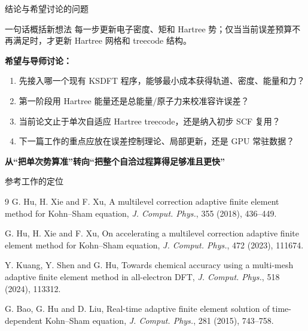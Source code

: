 \documentclass[aspectratio=169,11pt]{beamer}
\begin{document}
\begin{frame}{结论与希望讨论的问题}
  \begin{block}{一句话概括新想法}
    \centering
    每一步更新电子密度、矩和 Hartree 势；仅当当前误差预算不再满足时，才更新 Hartree 网格和 treecode 结构。
  \end{block}

  \vspace{0.35cm}
  \small
  \textbf{希望与导师讨论：}
  \begin{enumerate}\setlength\itemsep{0.48em}
    \item 先接入哪一个现有 KSDFT 程序，能够最小成本获得轨道、密度、能量和力？
    \item 第一阶段用 Hartree 能量还是总能量/原子力来校准容许误差？
    \item 当前论文止于单次自适应 Hartree treecode，还是纳入初步 SCF 复用？
    \item 下一篇工作的重点应放在误差控制理论、局部更新，还是 GPU 常驻数据？
  \end{enumerate}

  \vfill
  \centering\Large\bfseries\color{navy}
  从“把单次势算准”转向“把整个自洽过程算得足够准且更快”
\end{frame}

\begin{frame}{参考工作的定位}
  \footnotesize
  \begin{thebibliography}{9}
    G. Hu, H. Xie and F. Xu,
    \newblock A multilevel correction adaptive finite element method for Kohn--Sham equation,
    \newblock \emph{J. Comput. Phys.}, 355 (2018), 436--449.

    G. Hu, H. Xie and F. Xu,
    \newblock On accelerating a multilevel correction adaptive finite element method for Kohn--Sham equation,
    \newblock \emph{J. Comput. Phys.}, 472 (2023), 111674.

    Y. Kuang, Y. Shen and G. Hu,
    \newblock Towards chemical accuracy using a multi-mesh adaptive finite element method in all-electron DFT,
    \newblock \emph{J. Comput. Phys.}, 518 (2024), 113312.

    G. Bao, G. Hu and D. Liu,
    \newblock Real-time adaptive finite element solution of time-dependent Kohn--Sham equation,
    \newblock \emph{J. Comput. Phys.}, 281 (2015), 743--758.
  \end{thebibliography}

\end{frame}
\end{document}
